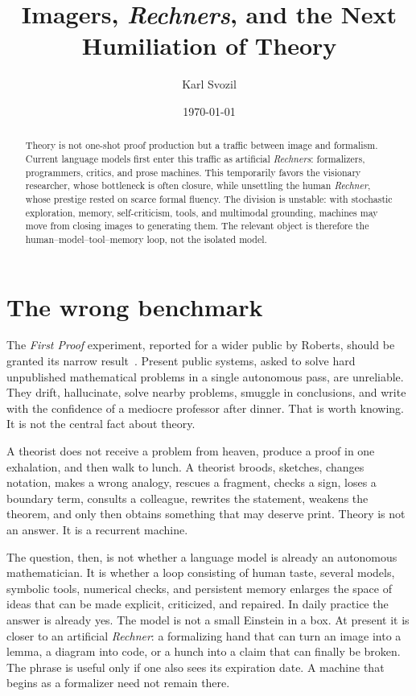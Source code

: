\documentclass[
  aps,
  reprint,
  superscriptaddress,
  floatfix,
  nofootinbib,
  longbibliography
]{revtex4-2}
\begin{document}
\title{Imagers, \emph{Rechners}, and the Next Humiliation of Theory}

\author{Karl Svozil}

\date{\today}

\begin{abstract}
Theory is not one-shot proof production but a traffic between image and
formalism. Current language models first enter this traffic as artificial
\emph{Rechners}: formalizers, programmers, critics, and prose machines. This
temporarily favors the visionary researcher, whose bottleneck is often closure,
while unsettling the human \emph{Rechner}, whose prestige rested on scarce formal
fluency. The division is unstable: with stochastic exploration, memory,
self-criticism, tools, and multimodal grounding, machines may move from closing
images to generating them. The relevant object is therefore the
human--model--tool--memory loop, not the isolated model.
\end{abstract}

\maketitle

\section{The wrong benchmark}

The \textit{First Proof} experiment, reported for a wider public by Roberts,
should be granted its narrow result~\cite{roberts2026,firstproof}. Present public
systems, asked to solve hard unpublished mathematical problems in a single
autonomous pass, are unreliable. They drift, hallucinate, solve nearby problems,
smuggle in conclusions, and write with the confidence of a mediocre professor
after dinner. That is worth knowing. It is not the central fact about theory.

A theorist does not receive a problem from heaven, produce a proof in one
exhalation, and then walk to lunch. A theorist broods, sketches, changes
notation, makes a wrong analogy, rescues a fragment, checks a sign, loses a
boundary term, consults a colleague, rewrites the statement, weakens the theorem,
and only then obtains something that may deserve print. Theory is not an answer.
It is a recurrent machine.

The question, then, is not whether a language model is already an autonomous
mathematician. It is whether a loop consisting of human taste, several models,
symbolic tools, numerical checks, and persistent memory enlarges the space of
ideas that can be made explicit, criticized, and repaired. In daily practice the
answer is already yes. The model is not a small Einstein in a box. At present it
is closer to an artificial \emph{Rechner}: a formalizing hand that can turn an
image into a lemma, a diagram into code, or a hunch into a claim that can finally
be broken. The phrase is useful only if one also sees its expiration date. A
machine that begins as a formalizer need not remain there.
\end{document}
